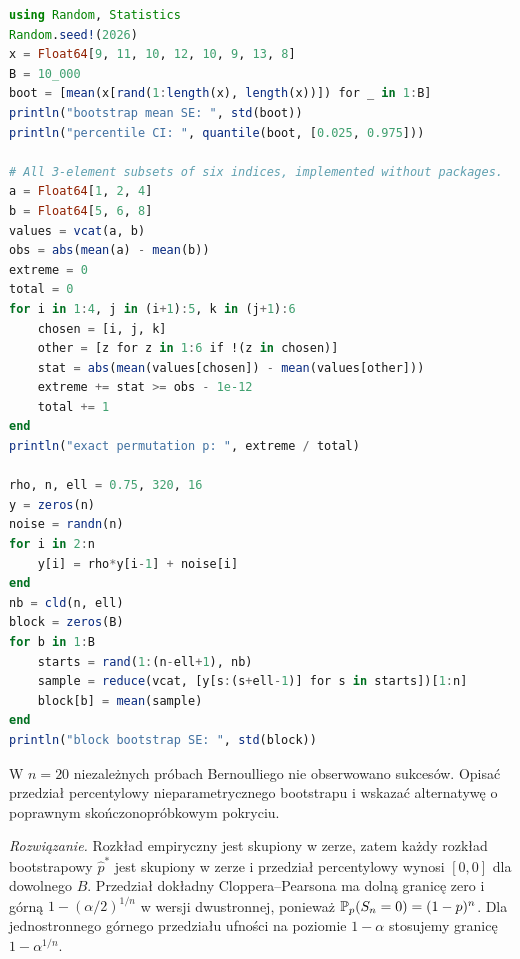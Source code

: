 \begin{lstlisting}[language=Julia,caption={Kompletny program: bootstrap, dokładny test permutacyjny i resampling bloków (Julia, Random i Statistics).}]
using Random, Statistics
Random.seed!(2026)
x = Float64[9, 11, 10, 12, 10, 9, 13, 8]
B = 10_000
boot = [mean(x[rand(1:length(x), length(x))]) for _ in 1:B]
println("bootstrap mean SE: ", std(boot))
println("percentile CI: ", quantile(boot, [0.025, 0.975]))

# All 3-element subsets of six indices, implemented without packages.
a = Float64[1, 2, 4]
b = Float64[5, 6, 8]
values = vcat(a, b)
obs = abs(mean(a) - mean(b))
extreme = 0
total = 0
for i in 1:4, j in (i+1):5, k in (j+1):6
    chosen = [i, j, k]
    other = [z for z in 1:6 if !(z in chosen)]
    stat = abs(mean(values[chosen]) - mean(values[other]))
    extreme += stat >= obs - 1e-12
    total += 1
end
println("exact permutation p: ", extreme / total)

rho, n, ell = 0.75, 320, 16
y = zeros(n)
noise = randn(n)
for i in 2:n
    y[i] = rho*y[i-1] + noise[i]
end
nb = cld(n, ell)
block = zeros(B)
for b in 1:B
    starts = rand(1:(n-ell+1), nb)
    sample = reduce(vcat, [y[s:(s+ell-1)] for s in starts])[1:n]
    block[b] = mean(sample)
end
println("block bootstrap SE: ", std(block))
\end{lstlisting}

\begin{zadanie}
W $n=20$ niezależnych próbach Bernoulliego nie obserwowano sukcesów.
Opisać przedział percentylowy nieparametrycznego bootstrapu
i wskazać alternatywę o poprawnym skończonopróbkowym pokryciu.
\par\emph{Rozwiązanie.} Rozkład empiryczny jest skupiony w zerze,
zatem każdy rozkład bootstrapowy $\widehat p^*$ jest skupiony
w zerze i przedział percentylowy wynosi $[0,0]$ dla dowolnego $B$.
Przedział dokładny Cloppera--Pearsona ma dolną granicę zero
i górną $1-(\alpha/2)^{1/n}$ w wersji dwustronnej,
ponieważ $\mathbb P_p(S_n=0)=(1-p)^n$.
Dla jednostronnego górnego przedziału ufności na poziomie
$1-\alpha$ stosujemy granicę $1-\alpha^{1/n}$.
\end{zadanie}


